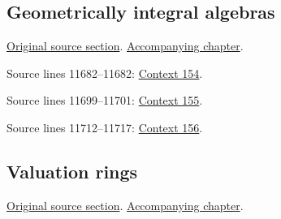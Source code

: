 \subsection{Geometrically integral algebras}
\hypertarget{algebra-source-section-geometrically-integral}{}
\noindent\href{https://github.com/stacks/stacks-project/blob/a04446e57ec1fbc252a871afcec7752fb2807b14/algebra.tex\#L11654}{Original source section}. \href{algebra.pdf\#nameddest=section-geometrically-integral}{Accompanying chapter}.

\begin{AlgebraSourceRoutes}
\item[ALGEBRA-RECON-318] Source lines 11682--11682: \hyperlink{algebra-context-154}{Context 154}.
\item[ALGEBRA-RECON-319] Source lines 11699--11701: \hyperlink{algebra-context-155}{Context 155}.
\item[ALGEBRA-RECON-320] Source lines 11712--11717: \hyperlink{algebra-context-156}{Context 156}.
\end{AlgebraSourceRoutes}

\subsection{Valuation rings}
\hypertarget{algebra-source-section-valuation-rings}{}
\noindent\href{https://github.com/stacks/stacks-project/blob/a04446e57ec1fbc252a871afcec7752fb2807b14/algebra.tex\#L11723}{Original source section}. \href{algebra.pdf\#nameddest=section-valuation-rings}{Accompanying chapter}.


